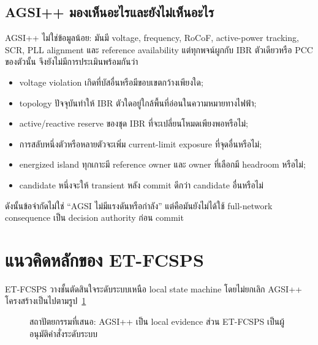 \documentclass[12pt,a4paper]{article}
\begin{document}
\subsection{AGSI++ มองเห็นอะไรและยังไม่เห็นอะไร}

AGSI++ ไม่ใช่ข้อมูลน้อย: มันมี voltage, frequency, RoCoF, active-power tracking, SCR,
PLL alignment และ reference availability แต่ทุกพจน์ผูกกับ IBR ตัวเดียวหรือ PCC ของตัวนั้น
จึงยังไม่มีการประเมินพร้อมกันว่า
\begin{itemize}
  \item voltage violation เกิดที่บัสอื่นหรือมีขอบเขตกว้างเพียงใด;
  \item topology ปัจจุบันทำให้ IBR ตัวใดอยู่ใกล้พื้นที่อ่อนในความหมายทางไฟฟ้า;
  \item active/reactive reserve ของชุด IBR ที่จะเปลี่ยนโหมดเพียงพอหรือไม่;
  \item การสลับหนึ่งตัวหรือหลายตัวจะเพิ่ม current-limit exposure ที่จุดอื่นหรือไม่;
  \item energized island ทุกเกาะมี reference owner และ owner ที่เลือกมี headroom หรือไม่;
  \item candidate หนึ่งจะให้ transient หลัง commit ดีกว่า candidate อื่นหรือไม่
\end{itemize}
ดังนั้นข้อจำกัดไม่ใช่ ``AGSI ไม่มีแรงดันหรือกำลัง'' แต่คือมันยังไม่ได้ใช้ full-network consequence
เป็น decision authority ก่อน commit

\section{แนวคิดหลักของ ET-FCSPS}

ET-FCSPS วางชั้นตัดสินใจระดับระบบเหนือ local state machine โดยไม่ยกเลิก AGSI++
โครงสร้างเป็นไปตามรูป~\ref{fig:architecture}

\begin{figure}[H]
\centering
{}
\caption{สถาปัตยกรรมที่เสนอ: AGSI++ เป็น local evidence ส่วน ET-FCSPS เป็นผู้อนุมัติคำสั่งระดับระบบ}
\label{fig:architecture}
\end{figure}
\end{document}
